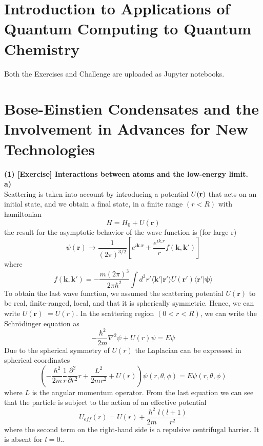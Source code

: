\documentclass{article}
\begin{document}
\section*{Introduction to Applications of Quantum Computing to Quantum Chemistry}
Both the Exercises and Challenge are uploaded as Jupyter notebooks.
\section*{Bose-Einstien Condensates and the Involvement in Advances for New Technologies}


\textbf{(1) [Exercise] Interactions between atoms and the low-energy limit.}\\

\textbf{a)}\\
Scattering is taken into account by introducing a potential $U(\bold{r})$ that acts on an initial state, and we obtain a final state, in a finite range $(r<R)$ with hamiltonian
\[
H = H_0 + U(\mathbf{r})
\]
the result for the asymptotic behavior of the wave function is (for large r)
\[
\psi(\mathbf{r})\rightarrow \frac{1}{(2\pi)^{3/2}} \left[ e^{i\mathbf{k.r}}+\frac{e^{ik.r}}{r}f(\mathbf{k},\mathbf{k'})\right]
\]
where
\[
f(\mathbf{k},\mathbf{k'})=-\frac{m(2\pi)^3}{2\pi\hbar^2}\int d^3r'\langle \mathbf{k'}|\mathbf{r'}\rangle U(\mathbf{r'})\langle \mathbf{r'}|\mathbf{\psi}\rangle 
\]
To obtain the last wave function, we assumed the scattering potential $U(\mathbf{r})$ to be real, finite-ranged, local, and that it is spherically symmetric. Hence, we can write $U(\mathbf{r})$ $= U(r)$. In the scattering region $(0 < r < R)$, we can write the Schrödinger equation as
\[
 -\frac{\hbar^2}{2m} \nabla^2\psi+U(r)\psi = E\psi
\]
Due to the spherical symmetry of $U(r)$ the Laplacian can be expressed in spherical coordinates
\[
 \left(-\frac{\hbar^2}{2m}\frac{1}{r}\frac{\partial^2}{\partial r^2}r+\frac{L^2}{2mr^2} +U(r)\right)\psi(r,\theta,\phi) = E\psi(r,\theta,\phi)
\]
where $L$ is the angular momentum operator. From the last equation we can see that the particle is subject to the action of an effective potential
\[
U_{eff}(r)=U(r)+\frac{\hbar^2}{2m}\frac{l(l+1)}{r^2}
\]
where the second term on the right-hand side is a
repulsive centrifugal barrier. It is absent for $l = 0$.. 
\end{document}
